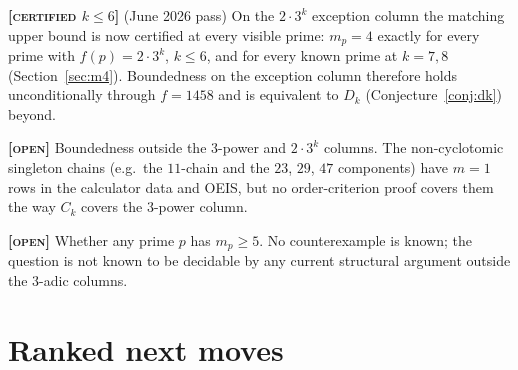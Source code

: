 \documentclass[11pt]{article}
\theoremstyle{plain}
\theoremstyle{definition}
\newcommand{\CERTIFIED}[1]{\textbf{[\textsc{certified} $#1$]}}
\newcommand{\OPEN}{\textbf{[\textsc{open}]}}
\begin{document}
\CERTIFIED{k\leq6} (June 2026 pass) On the $2\cdot3^k$ exception column
the matching upper bound is now certified at every visible prime:
$m_p=4$ exactly for every prime with $f(p)=2\cdot3^k$, $k\leq6$, and for
every known prime at $k=7,8$ (Section~\ref{sec:m4}). Boundedness on the
exception column therefore holds unconditionally through $f=1458$ and is
equivalent to $D_k$ (Conjecture~\ref{conj:dk}) beyond.

\OPEN{} Boundedness outside the $3$-power and $2\cdot3^k$ columns. The
non-cyclotomic singleton chains (e.g.\ the $11$-chain and the $23$, $29$,
$47$ components) have $m=1$ rows in the calculator data and OEIS, but no
order-criterion proof covers them the way $C_k$ covers the $3$-power
column.

\OPEN{} Whether any prime $p$ has $m_p\geq5$. No counterexample is known;
the question is not known to be decidable by any current structural
argument outside the $3$-adic columns.

\section{Ranked next moves}\label{sec:moves}
\end{document}
